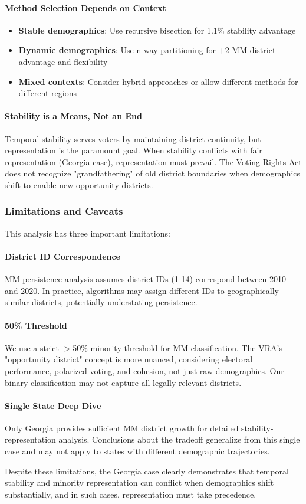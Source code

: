 \paragraph{Method Selection Depends on Context}
\begin{itemize}
\item \textbf{Stable demographics}: Use recursive bisection for 1.1\% stability advantage
\item \textbf{Dynamic demographics}: Use n-way partitioning for +2 MM district advantage and flexibility
\item \textbf{Mixed contexts}: Consider hybrid approaches or allow different methods for different regions
\end{itemize}

\paragraph{Stability is a Means, Not an End} Temporal stability serves voters by maintaining district continuity, but representation is the paramount goal. When stability conflicts with fair representation (Georgia case), representation must prevail. The Voting Rights Act does not recognize "grandfathering" of old district boundaries when demographics shift to enable new opportunity districts.

\subsubsection{Limitations and Caveats}

This analysis has three important limitations:

\paragraph{District ID Correspondence} MM persistence analysis assumes district IDs (1-14) correspond between 2010 and 2020. In practice, algorithms may assign different IDs to geographically similar districts, potentially understating persistence.

\paragraph{50\% Threshold} We use a strict $>$50\% minority threshold for MM classification. The VRA's "opportunity district" concept is more nuanced, considering electoral performance, polarized voting, and cohesion, not just raw demographics. Our binary classification may not capture all legally relevant districts.

\paragraph{Single State Deep Dive} Only Georgia provides sufficient MM district growth for detailed stability-representation analysis. Conclusions about the tradeoff generalize from this single case and may not apply to states with different demographic trajectories.

Despite these limitations, the Georgia case clearly demonstrates that temporal stability and minority representation can conflict when demographics shift substantially, and in such cases, representation must take precedence.
